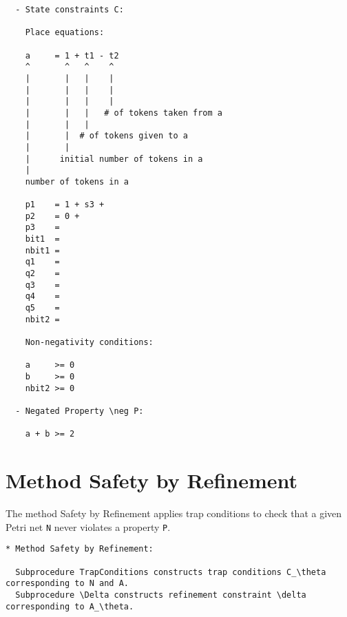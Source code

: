 \documentclass{llncs}
\begin{document}


\newpage

\begin{verbatim}
  - State constraints C:

    Place equations:
  
    a     = 1 + t1 - t2
    ^       ^   ^    ^
    |       |   |    |
    |       |   |    |
    |       |   |    |
    |       |   |   # of tokens taken from a
    |       |   |    
    |       |  # of tokens given to a
    |       |
    |      initial number of tokens in a
    |
    number of tokens in a

    p1    = 1 + s3 + 
    p2    = 0 + 
    p3    = 
    bit1  = 
    nbit1 = 
    q1    = 
    q2    = 
    q3    = 
    q4    = 
    q5    = 
    nbit2 = 
    
    Non-negativity conditions:
  
    a     >= 0
    b     >= 0
    nbit2 >= 0

  - Negated Property \neg P:

    a + b >= 2
\end{verbatim}

\newpage

\section{Method Safety by Refinement}

The method Safety by Refinement applies trap conditions to check that a given Petri net \verb=N= never violates a property \verb=P=.

\begin{verbatim}
* Method Safety by Refinement:

  Subprocedure TrapConditions constructs trap conditions C_\theta corresponding to N and A.
  Subprocedure \Delta constructs refinement constraint \delta corresponding to A_\theta.
\end{verbatim}
\end{document}
